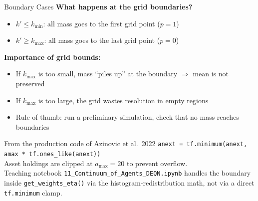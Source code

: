 \documentclass[aspectratio=169,11pt]{beamer}
\newcommand{\emphc}[1]{\textcolor{harvardcrimson}{#1}}
\begin{document}
\begin{frame}{Boundary Cases}
\textbf{What happens at the grid boundaries?}

\vspace{0.5em}
\begin{itemize}
    \item $k' \leq k_{\min}$: all mass goes to the \emphc{first grid point} ($p = 1$)
    \item $k' \geq k_{\max}$: all mass goes to the \emphc{last grid point} ($p = 0$)
\end{itemize}

\vspace{0.5em}
\textbf{Importance of grid bounds:}
\begin{itemize}
    \item If $k_{\max}$ is too small, mass ``piles up'' at the boundary $\Rightarrow$ \emphc{mean is not preserved}
    \item If $k_{\max}$ is too large, the grid wastes resolution in empty regions
    \item Rule of thumb: run a preliminary simulation, check that no mass reaches boundaries
\end{itemize}

\vspace{0.5em}
\begin{block}{From the production code of Azinovic et al.\ 2022}
\vspace{-0.2em}
\texttt{anext = tf.minimum(anext, amax * tf.ones\_like(anext))}\\[2pt]
{\small Asset holdings are clipped at $a_{\max} = 20$ to prevent overflow.\\
\emphc{Teaching notebook \texttt{11\_Continuum\_of\_Agents\_DEQN.ipynb} handles the boundary inside \texttt{get\_weights\_eta()} via the histogram-redistribution math, not via a direct \texttt{tf.minimum} clamp.}}
\end{block}
\end{frame}
\end{document}

